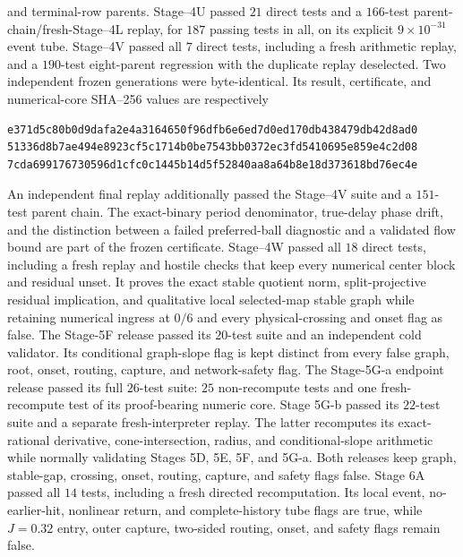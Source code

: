 and terminal-row parents.  Stage--4U passed \(21\) direct tests and a
\(166\)-test parent-chain/fresh-Stage--4L replay, for \(187\) passing tests in
all, on its explicit \(9\times10^{-31}\) event tube.
Stage--4V passed all \(7\) direct tests, including a fresh arithmetic replay,
and a \(190\)-test eight-parent regression with the duplicate replay
deselected.  Two independent frozen generations were byte-identical.  Its
result, certificate, and numerical-core SHA--256 values are respectively
\begin{verbatim}
e371d5c80b0d9dafa2e4a3164650f96dfb6e6ed7d0ed170db438479db42d8ad0
51336d8b7ae494e8923cf5c1714b0be7543bb0372ec3fd5410695e859e4c2d08
7cda699176730596d1cfc0c1445b14d5f52840aa8a64b8e18d373618bd76ec4e
\end{verbatim}
An independent final replay additionally passed the Stage--4V suite and a
\(151\)-test parent chain.  The exact-binary period denominator, true-delay
phase drift, and the distinction between a failed preferred-ball diagnostic
and a validated flow bound are part of the frozen certificate.
Stage--4W passed all \(18\) direct tests, including a fresh replay and hostile
checks that keep every numerical center block and residual unset.  It proves
the exact stable quotient norm, split-projective residual implication, and
qualitative local selected-map stable graph while retaining numerical ingress
at \(0/6\) and every physical-crossing and onset flag as false.
The Stage-5F release passed its \(20\)-test suite
and an independent cold validator.  Its
conditional graph-slope flag is kept distinct from every false graph, root,
onset, routing, capture, and network-safety flag.
The Stage-5G-a endpoint release passed its full \(26\)-test suite: \(25\)
non-recompute tests and one fresh-recompute test of its proof-bearing numeric
core.  Stage 5G-b passed its \(22\)-test suite and a separate
fresh-interpreter replay.  The
latter recomputes its exact-rational derivative, cone-intersection, radius,
and conditional-slope arithmetic while normally validating Stages 5D, 5E,
5F, and 5G-a.  Both releases keep graph, stable-gap, crossing, onset, routing,
capture, and safety flags false.  Stage 6A passed all \(14\) tests, including
a fresh directed recomputation.  Its local event, no-earlier-hit, nonlinear
return, and complete-history tube flags are true, while \(J=0.32\) entry,
outer capture, two-sided routing, onset, and safety flags remain false.

